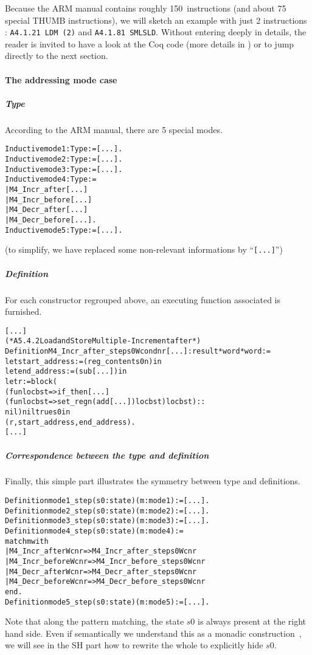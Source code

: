 \documentclass[a4paper, 11pt]{article}
\newenvironment{coq}
  {%
   \begin{alltt}
   \footnotesize} %% 8.3pl2 (April 2011)
  {\end{alltt} %
  }
\begin{document}
Because the ARM manual contains roughly 150~instructions (and about 75 special THUMB instructions), we will sketch an example with just 2 instructions : {\tt A4.1.21 LDM (2)} and {\tt A4.1.81 SMLSLD}. Without entering deeply in details, the reader is invited to have a look at the Coq code (more details in \cite{urlsscert}) or to jump directly to the next section.

\paragraph{The addressing mode case}
  \subparagraph{Type}
According to the ARM manual, there are 5 special modes.
\begin{coq}
Inductive mode1 : Type := [...].
Inductive mode2 : Type := [...].
Inductive mode3 : Type := [...].
Inductive mode4 : Type :=
  | M4\_Incr\_after         [...] 
  | M4\_Incr\_before        [...]
  | M4\_Decr\_after         [...]
  | M4\_Decr\_before        [...].
Inductive mode5 : Type := [...].  
\end{coq}
(to simplify, we have replaced some non-relevant informations by ``\verb|[...]|'')
  \subparagraph{Definition}
For each constructor regrouped above, an executing function associated is furnished.
\begin{coq}
[...]
(* A5.4.2 Load and Store Multiple - Increment after *)
Definition M4_Incr_after_step s0 W cond n r [...] : result * word * word :=
  let start_address := (reg_content s0 n) in
  let end_address := (sub [...]) in
  let r := block (
    (fun loc b st => if_then [...]
      (fun loc b st => set_reg n (add [...]) loc b st) loc b st) ::
    nil) nil true s0 in
    (r, start_address, end_address).
[...]
\end{coq}
  \subparagraph{Correspondence between the type and definition}
Finally, this simple part illustrates the symmetry between type and definitions. 
\begin{coq}
Definition mode1\_step (s0 : state) (m : mode1) := [...].
Definition mode2\_step (s0 : state) (m : mode2) := [...].
Definition mode3\_step (s0 : state) (m : mode3) := [...].
Definition mode4\_step (s0 : state) (m : mode4) :=
  match m with
    | M4\_Incr\_after W c n r => M4\_Incr\_after\_step s0 W c n r
    | M4\_Incr\_before W c n r => M4\_Incr\_before\_step s0 W c n r
    | M4\_Decr\_after W c n r => M4\_Decr\_after\_step s0 W c n r
    | M4\_Decr\_before W c n r => M4\_Decr\_before\_step s0 W c n r
  end.
Definition mode5\_step (s0 : state) (m : mode5) := [...].
\end{coq}
Note that along the pattern matching, the state $s0$ is always present at the right hand side. Even if semantically we understand this as a monadic construction~\cite{peyton-jones-wadler-93, peyton-jones-tackling-09}, we will see in the SH part how to rewrite the whole to explicitly hide $s0$.
\end{document}
